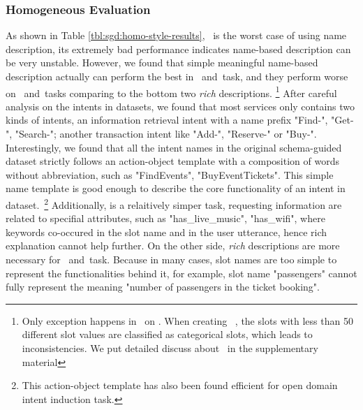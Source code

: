 \subsubsection{Homogeneous Evaluation}
\label{sssec:homo-eval}
 As shown in Table
\ref{tbl:sgd:homo-style-results}, \ID~is the worst case of using name
description, its extremely bad performance indicates name-based
description can be very unstable. However, we found that simple
meaningful name-based description actually can perform the best in
\IC~and~\RSI task, and they perform worse on \CSL~and~\NSL tasks
comparing to the bottom two {\it rich} descriptions. \footnote{Only
  exception happens in \CSL~on \multiwoz. When creating
  \multiwoz~\cite{zang-etal-2020-multiwoz}, the slots with less than
  50 different slot values are classified as categorical slots, which
  leads to inconsistencies. We put detailed discuss about \multiwoz~in
  the supplementary material} After careful analysis on the intents in
\sgdst datasets, we found that most services only contains two kinds
of intents, an information retrieval intent with a name prefix
"Find-", "Get-", "Search-"; another transaction intent like "Add-",
"Reserve-" or "Buy-". Interestingly, we found that all the intent
names in the original schema-guided dataset strictly follows an
action-object template with a composition of words without
abbreviation, such as "FindEvents", "BuyEventTickets". This simple
name template is good enough to describe the core functionality of an
intent in \sgdst dataset.~\footnote{This action-object template has
  also been found efficient for open domain intent induction
  task\cite[e.g.,][OPINE]{vedula2020open}.} Additionally, \RSI is a
relaitively simper task, requesting information are related to
specifial attributes, such as "has\_live\_music", "has\_wifi", where
keywords co-occured in the slot name and in the user utterance, hence
rich explanation cannot help further. On the other side, {\it rich}
descriptions are more necessary for \CSL~and~\NSL task. Because in
many cases, slot names are too simple to represent the functionalities
behind it, for example, slot name "passengers" cannot fully represent
the meaning "number of passengers in the ticket booking".

